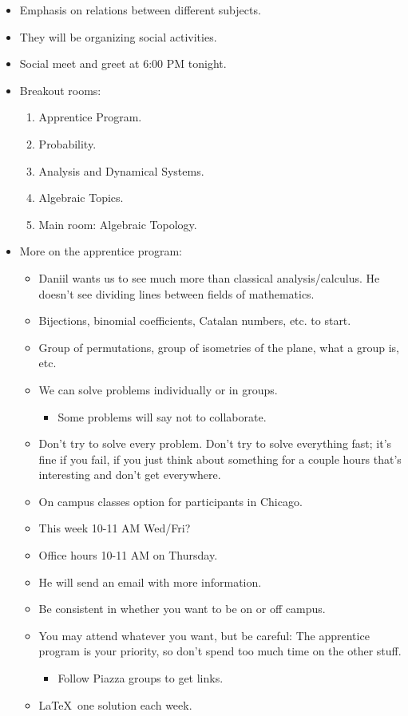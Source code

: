 \documentclass[../main.tex]{subfiles}
\begin{document}
\begin{itemize}
\begin{itemize}
\begin{itemize}
        \end{itemize}
    \end{itemize}
    \item Emphasis on relations between different subjects.
    \item They will be organizing social activities.
    \item Social meet and greet at 6:00 PM tonight.
    \item Breakout rooms:
    \begin{enumerate}
        \item Apprentice Program.
        \item Probability.
        \item Analysis and Dynamical Systems.
        \item Algebraic Topics.
        \item Main room: Algebraic Topology.
    \end{enumerate}
    \item More on the apprentice program:
    \begin{itemize}
        \item Daniil wants us to see much more than classical analysis/calculus. He doesn't see dividing lines between fields of mathematics.
        \item Bijections, binomial coefficients, Catalan numbers, etc. to start.
        \item Group of permutations, group of isometries of the plane, what a group is, etc.
        \item We can solve problems individually or in groups.
        \begin{itemize}
            \item Some problems will say not to collaborate.
        \end{itemize}
        \item Don't try to solve every problem. Don't try to solve everything fast; it's fine if you fail, if you just think about something for a couple hours that's interesting and don't get everywhere.
        \item On campus classes option for participants in Chicago.
        \item This week 10-11 AM Wed/Fri?
        \item Office hours 10-11 AM on Thursday.
        \item He will send an email with more information.
        \item Be consistent in whether you want to be on or off campus.
        \item You may attend whatever you want, but be careful: The apprentice program is your priority, so don't spend too much time on the other stuff.
        \begin{itemize}
            \item Follow Piazza groups to get links.
        \end{itemize}
        \item \LaTeX\ one solution each week.
    \end{itemize}
\end{itemize}
\end{document}
